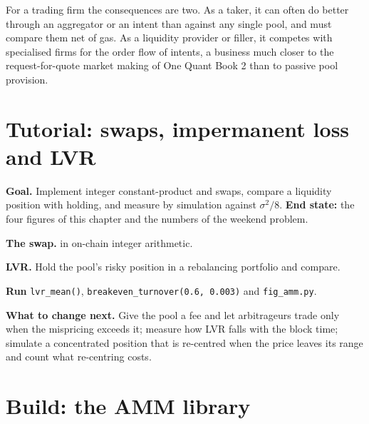 For a trading firm the consequences are two. As a taker, it can often do better through an aggregator or an intent than against any single pool, and
must compare them net of gas. As a liquidity provider or filler, it competes with specialised firms for the order flow of intents, a business much
closer to the request-for-quote market making of One Quant Book 2 than to passive pool provision.

\section{Tutorial: swaps, impermanent loss and LVR}\label{tut:m3:automated-market-makers:lvr}

\begin{tutorial}
\textbf{Goal.} Implement integer constant-product and  swaps, compare a liquidity position with holding, and measure 
by simulation against $\sigma^2/8$. \textbf{End state:} the four figures of this chapter and the numbers of the weekend problem.
\begin{tutsteps}
\item \textbf{The swap.}  in on-chain integer arithmetic.
\label{lst:m3:automated-market-makers:cp}
\item \textbf{LVR.} Hold the pool's risky position in a rebalancing portfolio and compare.
\label{lst:m3:automated-market-makers:lvr}
\item \textbf{Run} \texttt{lvr\_mean()}, \texttt{breakeven\_turnover(0.6, 0.003)} and \texttt{fig\_amm.py}.
\end{tutsteps}
\textbf{What to change next.} Give the pool a fee and let arbitrageurs trade only when the mispricing exceeds it; measure how LVR falls with the block time;
simulate a concentrated position that is re-centred when the price leaves its range and count what re-centring costs.
\end{tutorial}

\section{Build: the AMM library}\label{bld:m3:automated-market-makers:amm}

